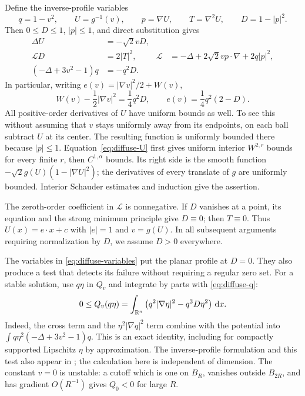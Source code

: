 Define the inverse-profile variables
\begin{equation}\label{eq:diffuse-variables}
 q=1-v^2,\qquad U=g^{-1}(v),\qquad p=\nabla U,\qquad
 T=\nabla^2U,\qquad D=1-|p|^2.
\end{equation}
Then $0\le D\le1$, $|p|\le1$, and direct substitution gives
\begin{align}
 \Delta U&=-\sqrt2 vD,\label{eq:diffuse-U}\\
 \mathcal L D&=2|T|^2,
 &\mathcal L&=-\Delta+2\sqrt2 vp\cdot\nabla+2q|p|^2,
 \label{eq:diffuse-D}\\
 (-\Delta+3v^2-1)q&=-q^2D.\label{eq:diffuse-q}
\end{align}
In particular, writing $e(v)=|\nabla v|^2/2+W(v)$,
\begin{equation}\label{eq:diffuse-energy}
 W(v)-\frac12|\nabla v|^2=\frac14q^2D,
 \qquad e(v)=\frac14q^2(2-D).
\end{equation}
All positive-order derivatives of $U$ have uniform bounds as well. To see
this without assuming that $v$ stays uniformly away from its endpoints,
on each ball subtract $U$ at its center. The resulting function is uniformly
bounded there because $|p|\le1$. Equation~\eqref{eq:diffuse-U} first gives
uniform interior $W^{2,r}$ bounds for every finite $r$, then $C^{1,\alpha}$
bounds. Its right side is the smooth function
$-\sqrt2 g(U)(1-|\nabla U|^2)$; the derivatives of every translate of $g$
are uniformly bounded. Interior Schauder estimates and induction give the
assertion.

The zeroth-order coefficient in $\mathcal L$ is nonnegative. If $D$ vanishes
at a point, its equation and the strong minimum principle give $D\equiv0$;
then $T\equiv0$. Thus $U(x)=e\cdot x+c$ with $|e|=1$ and $v=g(U)$.
In all subsequent arguments requiring normalization by $D$, we assume
$D>0$ everywhere.

The variables in \eqref{eq:diffuse-variables} put the planar profile
at $D=0$. They also produce a test that detects its failure without
requiring a regular zero set. For a stable solution, use $q\eta$ in
$Q_v$ and integrate by parts with \eqref{eq:diffuse-q}:
\begin{equation}\label{eq:q-stability}
 0\le Q_v(q\eta)
   =\int_{\mathbb R^n}\big(q^2|\nabla\eta|^2-q^3D\eta^2\big)\,\,\mathrm d x.
\end{equation}
Indeed, the cross term and the $\eta^2|\nabla q|^2$ term combine with
the potential into $\int q\eta^2(-\Delta+3v^2-1)q$.
This is an exact identity, including for compactly supported Lipschitz
$\eta$ by approximation. The inverse-profile formulation and this test
also appear in \citet[Lemma~2.1]{LLWWW2026}; the calculation here is
independent of dimension. The constant $v=0$ is unstable: a cutoff
which is one on $B_R$, vanishes outside $B_{2R}$, and has gradient
$O(R^{-1})$ gives $Q_0<0$ for large $R$.

